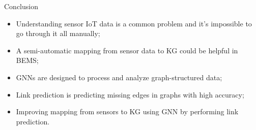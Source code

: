 \begin{tframe}{Conclusion}
\begin{itemize}
    \item Understanding sensor IoT data is a common problem and it's impossible to go through it all manually;
    \item A semi-automatic mapping from sensor data to KG could be helpful in BEMS;
    \item GNNs are designed to process and analyze graph-structured data;
    \item Link prediction is predicting missing edges in graphs with high accuracy;
    \item Improving mapping from sensors to KG using GNN by performing link prediction.
\end{itemize}
\end{tframe}